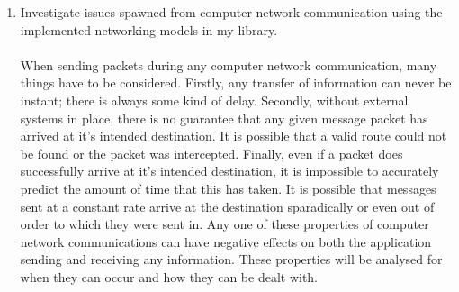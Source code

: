 \begin{enumerate}
\item Investigate issues spawned from computer network communication using the implemented networking models in my library.
  \\\\
  When sending packets during any computer network communication, many things have to be considered. Firstly, any transfer of information can never be instant; there is always some kind of delay. Secondly, without external systems in place, there is no guarantee that any given message packet has arrived at it's intended destination. It is possible that a valid route could not be found or the packet was intercepted. Finally, even if a packet does successfully arrive at it's intended destination, it is impossible to accurately predict the amount of time that this has taken. It is possible that messages sent at a constant rate arrive at the destination sparadically or even out of order to which they were sent in.
  Any one of these properties of computer network communications can have negative effects on both the application sending and receiving any information. These properties will be analysed for when they can occur and how they can be dealt with.
\end{enumerate}


\newpage

